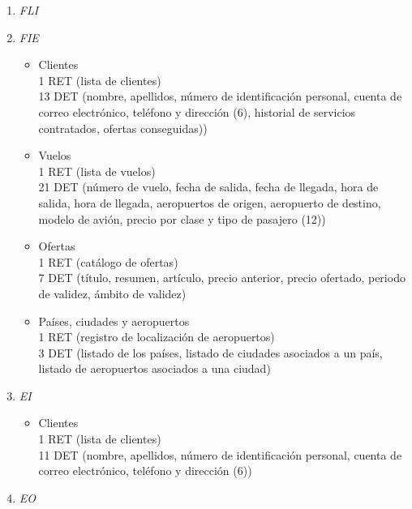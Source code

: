 		\begin{enumerate}
			\item\textit{ FLI}
			\item\textit{ FIE}
	
				\begin{itemize}
					\item Clientes \\
					{1 RET (lista de clientes)}\\
					{13 DET (nombre, apellidos, número de identificación personal, cuenta de correo electrónico, teléfono y dirección (6),
					historial de servicios contratados, ofertas conseguidas))}\\
					\item Vuelos \\
					{1 RET (lista de vuelos)}\\
					{21 DET (número de vuelo, fecha de salida, fecha de llegada, hora de salida, hora de llegada, aeropuertos de origen,
					aeropuerto de destino, modelo de avión, precio por clase y tipo de pasajero (12))}\\
					\item Ofertas \\
					{1 RET (catálogo de ofertas)}\\
					{7 DET (título, resumen, artículo, precio anterior, precio ofertado, periodo de validez, ámbito de validez)}\\
					\item Países, ciudades y aeropuertos \\
					{1 RET (registro de localización de aeropuertos)}\\
					{3 DET (listado de los países, listado de ciudades asociados a un país, listado de aeropuertos asociados a una ciudad)}\\
				\end{itemize}

			\item \textit{EI}
	
				\begin{itemize}
					\item Clientes \\
					{1 RET (lista de clientes)}\\
					{11 DET (nombre, apellidos, número de identificación personal, cuenta de correo electrónico, teléfono y dirección (6))}\\
				\end{itemize}

			\item \textit{EO}
	

\end{enumerate}
